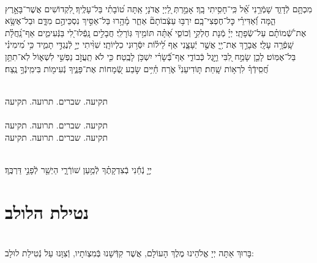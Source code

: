 \documentclass[twoside, openany, parskip=half, 11pt]{book}
\begin{document}
\begin{sometimes}

\\
%
מִכְתָּ֥ם לְֿדָוִ֑ד שָׁמְֿרֵ֥נִי אֵ֝֗ל כִּֽי־חָסִ֥יתִי בָֽךְ׃ אָמַ֣רְתְּ לַ֭יְיָ אֲדֹנָי֥ אַֽתָּה ט֝וֹבָתִ֗י בַּל־עָלֶֽיךָ׃ לִ֭קְדוֹשִׁים אֲשֶׁר־בָּאָ֣רֶץ הֵ֑מָּה וְֿ֝אַדִּירֵ֗י כׇּל־חֶפְצִי־בָֽם׃ יִרְבּ֥וּ עַצְּֿבוֹתָם֘ אַחֵ֢ר מָ֫הָ֥רוּ בַּל־אַסִּ֣יךְ נִסְכֵּיהֶ֣ם מִדָּ֑ם וּבַל־אֶשָּׂ֥א אֶת־שְֿׁ֝מוֹתָ֗ם עַל־שְֿׂפָתָֽי׃ יְיָ֗ מְֿנָת חֶלְקִ֣י וְֿכוֹסִ֑י אַ֝תָּ֗ה תּוֹמִ֥יךְ גּֽוֹרָלִֽי׃ חֲבָלִ֣ים נָֽפְֿלוּ־לִ֭י בַּנְּֿעִימִ֑ים אַף־נַֽ֝חֲלָ֗ת שָֽׁפְֿרָ֥ה עָלָֽי׃ אֲבָרֵ֣ךְ אֶת־יְ֖יָ אֲשֶׁ֣ר יְֿעָצָ֑נִי אַף לֵ֝יל֗וֹת יִסְּֿר֥וּנִי כִלְיוֹתָֽי׃ שִׁוִּ֨יתִי יְיָ֣ לְֿנֶגְדִּ֣י תָמִ֑יד כִּ֥י מִ֝ימִינִ֗י בַּל־אֶמּֽוֹט׃ לָכֵ֤ן שָׂמַ֣ח לִ֭בִּי וַיָּ֣גֶל כְּֿבוֹדִ֑י אַף־בְּֿֿ֝שָׂרִ֗י יִשְׁכֹּ֥ן לָבֶֽטַח׃ כִּ֤י לֹא תַֽעֲזֹ֣ב נַפְשִׁ֣י לִשְׁא֑וֹל לֹֽא־תִתֵּ֥ן חֲ֝סִֽידְֿךָ֗ לִרְא֥וֹת שָֽׁחַת׃ תּ֤וֹדִיעֵנִי֘ אֹ֢רַח חַ֫יִּ֥ים שׂ֣בַע שְֿׂ֭מָחוֹת אֶת־פָּנֶ֑יךָ נְֿעִימ֖וֹת בִּימִֽינְֿךָ֣ נֶֽצַח׃

\end{sometimes}



\begin{sometimes}

\\
תקיעה. שברים. תרועה. תקיעה\\
\\
תקיעה. שברים. תרועה. תקיעה\\
תקיעה. שברים. תרועה. תקיעה

\end{sometimes}

\vspace{-.5\baselineskip}

\\
 יְיָ֤ נְֿחֵ֬נִי בְֿצִדְקָתֶ֗ךָ לְֿמַ֥עַן שׁוֹרְֿרָ֑י הַיְשַׁ֖ר לְֿפָנַ֣י דַּרְכֶּֽךָ׃

\vfill

\quad{}\quad{}






\section[נטילת הלולב]{ נטילת הלולב }
\label{lulav}
\\
בָּרוּךְ אַתָּה יְיָ אֱלֹהֵינוּ מֶלֶךְ הָעוֹלָם, אֲשֶׁר קִדְּֿשָׁנוּ בְּֿמִצְוֹתָיו, וְֿצִוָּנוּ עַל נְֿטִילַת לוּלָב:
\end{document}
